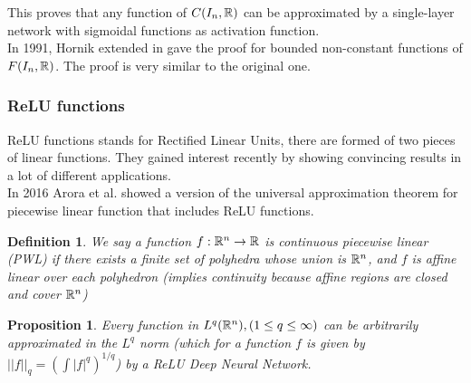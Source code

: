 \documentclass[12pt, a4paper]{article}
\newtheorem{proposition}{Proposition}
\newtheorem{definition}{Definition}
\begin{document}
  This proves that any function of $C(I_n, \mathbb{R})$ can be approximated by a single-layer network with sigmoidal functions as activation function.\\

  In 1991, Hornik extended in \cite{hornik_approximation_1991} gave the proof for bounded non-constant functions of $F(I_n,\mathbb{R})$. The proof is very similar to the original one.\\

\subsubsection{ReLU functions}

ReLU functions stands for Rectified Linear Units, there are formed of two pieces of linear functions. They gained interest recently by showing convincing results in a lot of different applications.\\ 

In 2016 Arora et al. \cite{arora_understanding_2018} showed a version of the universal approximation theorem for piecewise linear function that includes ReLU functions.\\

\begin{definition}
  We say a function $f: \mathbb{R}^n \to \mathbb{R}$ is continuous piecewise linear (PWL) if there exists a finite set of polyhedra whose union is $\mathbb{R}^n$, and $f$ is affine linear over each polyhedron (implies continuity because affine regions are closed and cover $\mathbb{R}^n$)
\end{definition}

\begin{proposition}
  Every function in $L^q(\mathbb{R}^n), (1 \le q \le \infty)$ can be arbitrarily approximated in the $L^q$ norm (which for a function $f$ is given by $||f||_q = (\int |f|^q)^{1/q}$) by a ReLU Deep Neural Network.
\end{proposition}
\end{document}
